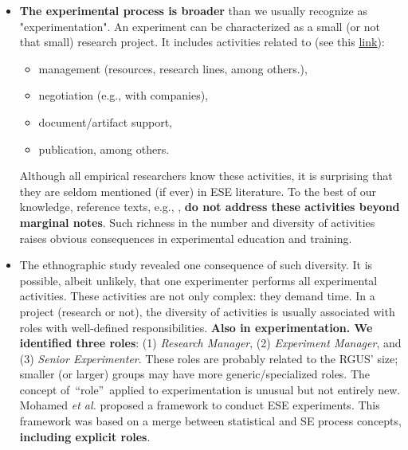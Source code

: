 \begin{itemize}
	\item \textbf{The experimental process is broader} than we usually recognize as "experimentation". An experiment can be characterized as a small (or not that small) research project. It includes activities related to (see this \href{https://zenodo.org/record/7105096#.YyxsxezMLUJ}{\ul{link}}):
		\begin{itemize}
			\item management (resources, research lines, among others.),
			\item negotiation (e.g., with companies), 
			\item document/artifact support, 
			\item publication, among others.
		\end{itemize}
Although all empirical researchers know these activities, it is surprising that they are seldom mentioned (if ever) in ESE literature. To the best of our knowledge, reference texts, e.g., \cite{Wohlin-2000-Experimentation-SE,Juristo-2001-SE-experimentation}, \textbf{do not address these activities beyond marginal notes}. Such richness in the number and diversity of activities raises obvious consequences in experimental education and training.
	\item The ethnographic study revealed one consequence of such diversity. It is possible, albeit unlikely, that one experimenter performs all experimental activities. These activities are not only complex: they demand time. In a project (research or not), the diversity of activities is usually associated with roles with well-defined responsibilities. \textbf{Also in experimentation. We identified three roles}: (1) \textit{Research Manager}, (2) \textit{Experiment Manager}, and (3) \textit{Senior Experimenter}. These roles are probably related to the RGUS' size; smaller (or larger) groups may have more generic/specialized roles. The concept of~\textquotedblleft role\textquotedblright~applied to experimentation is unusual but not entirely new. Mohamed \textit{et al.} \cite{Mohamed-1993-roles-ESE} proposed a framework to conduct ESE experiments. This framework was based on a merge between statistical and SE process concepts, \textbf{including explicit roles}.

\end{itemize}
